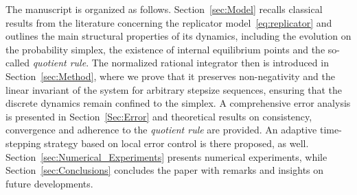 \documentclass[11pt,letterpaper]{article}
\theoremstyle{remark}
\begin{document}
The manuscript is organized as follows. Section~\ref{sec:Model} recalls classical results from the literature concerning the replicator model~\eqref{eq:replicator} and outlines the main structural properties of its dynamics, including the evolution on the probability simplex, the existence of internal equilibrium points and the so-called \emph{quotient rule}. The normalized rational integrator then is introduced in Section~\ref{sec:Method}, where we prove that it preserves non-negativity and the linear invariant of the system for arbitrary stepsize sequences, ensuring that the discrete dynamics remain confined to the simplex. A comprehensive error analysis is presented in Section~\ref{Sec:Error} and theoretical results on consistency, convergence and adherence to the \emph{quotient rule} are provided. An adaptive time-stepping strategy based on local error control is there proposed, as well. Section~\ref{sec:Numerical_Experiments} presents numerical experiments, while Section~\ref{sec:Conclusions} concludes the paper with remarks and insights on future developments.
\end{document}
